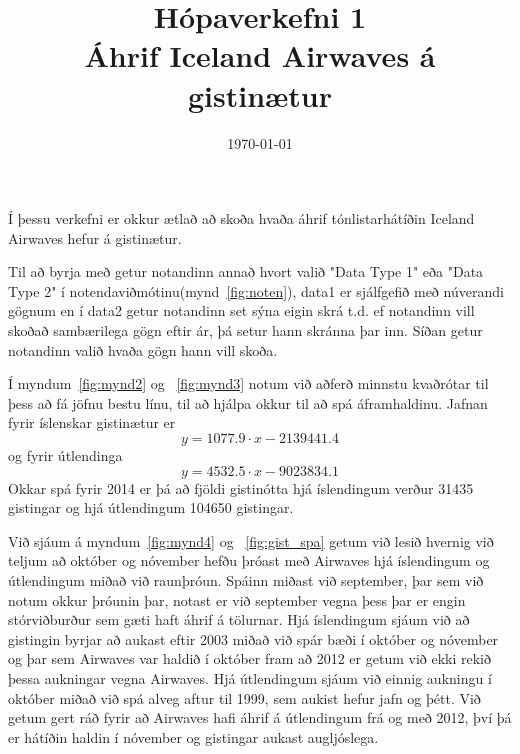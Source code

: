 \documentclass[11pt,a4paper]{amsart}
\theoremstyle{plain}
\theoremstyle{definition}
\theoremstyle{remark}
\begin{document}
\title{Hópaverkefni 1 \\ Áhrif Iceland Airwaves á gistinætur}
\address{School of Computer Science, Reykjavik University,
Menntavegi 1,  \mbox{Reykjavík}, Iceland}
\date{\today}

\maketitle

Í þessu verkefni er okkur ætlað að skoða hvaða áhrif tónlistarhátíðin Iceland Airwaves hefur á gistinætur.\par
Til að byrja með getur notandinn annað hvort valið "Data Type 1" eða "Data Type 2" í notendaviðmótinu(mynd~\ref{fig:noten}), data1 er sjálfgefið með núverandi gögnum en í data2 getur notandinn set sýna eigin skrá t.d. ef notandinn vill skoðað sambærilega gögn eftir ár, þá setur hann skránna þar inn. Síðan getur notandinn valið hvaða gögn hann vill skoða.\\\par

Í myndum~\ref{fig:mynd2} og ~\ref{fig:mynd3} notum við aðferð minnstu kvaðrótar til þess að fá jöfnu bestu línu, til að hjálpa okkur til að spá áframhaldinu. Jafnan fyrir íslenskar gistinætur er $$ y = 1077.9 \cdot x - 2139441.4  $$ og fyrir útlendinga $$ y = 4532.5 \cdot x - 9023834.1 $$
Okkar spá fyrir 2014 er þá að fjöldi gistinótta hjá íslendingum verður 31435 gistingar og hjá útlendingum 104650 gistingar.

Við sjáum á myndum~\ref{fig:mynd4} og ~\ref{fig:gist_spa} getum við lesið hvernig við teljum að október og nóvember hefðu þróast með Airwaves hjá íslendingum og útlendingum miðað við raunþróun. Spáinn miðast við september, þar sem við notum okkur þróunin þar, notast er við september vegna þess þar er engin stórviðburður sem gæti haft áhrif á tölurnar. Hjá íslendingum sjáum við að gistingin byrjar að aukast eftir 2003 miðað við spár bæði í október og nóvember og þar sem Airwaves var haldið í október fram að 2012 er getum við ekki rekið þessa aukningar vegna Airwaves. Hjá útlendingum sjáum við einnig aukningu í október miðað við spá alveg aftur til 1999, sem aukist hefur jafn og þétt. Við getum gert ráð fyrir að Airwaves hafi áhrif á útlendingum frá og með 2012, því þá er hátíðin haldin í nóvember og gistingar aukast augljóslega.
\end{document}
